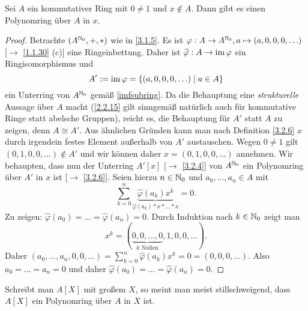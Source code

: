 \documentclass[../../main.tex]{subfiles}
\begin{document}
\begin{sat}\label{polynomialringexists}
Sei $A$ ein kommutativer Ring mit $0\neq 1$ und $x\notin A$. Dann gibt es einen Polynomring über $A$ in $x$.
\end{sat}
\begin{proof}
Betrachte $(A^{\mathbb N_0},+,*)$ wie in \ref{3.1.5}. Es ist $\varphi:A\rightarrow A^{\mathbb N_0}, a\mapsto (a,0,0,0,\ldots)$ [$\to$ \ref{1.1.30} (c)] eine Ringeinbettung. Daher ist $\widehat{\varphi} :A\to \operatorname{im} \varphi$ ein Ringisomorphismus und
\[A':=\operatorname{im}\varphi=\left\{(a,0,0,0,\ldots)\mid a\in A\right\}\] ein Unterring von $A^{\mathbb N_0}$ gemäß \ref{imfsubring}. Da die Behauptung eine \emph{strukturelle} Aussage über $A$ macht (\ref{2.2.15} gilt sinngemäß natürlich auch für kommutative Ringe statt abelsche Gruppen), reicht es, die Behauptung für $A'$ statt $A$ zu zeigen, denn $A\cong A'$. Aus ähnlichen Gründen kann man nach Definition \ref{3.2.6} $x$ durch irgendein festes Element außerhalb von $A'$ austauschen. Wegen $0\neq 1$ gilt $(0,1,0,0,\ldots)\notin A'$ und wir können daher $x=(0,1,0,0,\ldots)$ annehmen. Wir behaupten, dass nun der Unterring $A'[x]$ [$\to$ \ref{3.2.4}] von $A^{\mathbb N_0}$ ein Polynomring über $A'$ in $x$ ist [$\to$ \ref{3.2.6}]. Seien hierzu $n\in\mathbb N_0$ und $a_0,\ldots,a_n\in A$ mit
\[\sum_{k=0}^n \underbrace{\widehat{\varphi} (a_k)x^k}_{\widehat{\varphi} (a_k)*x*\ldots*x}=0.\] Zu zeigen:
$\widehat{\varphi} (a_0)=\ldots=\widehat{\varphi} (a_n)=0$. Durch Induktion nach $k\in\mathbb N_0$ zeigt man
\[x^k=(\underbrace{0,0,\ldots,0}_{k\text{ Nullen}},1,0,0,\ldots).\] Daher $(a_0,\ldots,a_n,0,0,\ldots)=\sum_{k=0}^n\widehat{\varphi}(a_k)x^k=0=(0,0,0,\ldots)$. Also $a_0=\ldots=a_n=0$ und daher $\widehat{\varphi} (a_0)=\ldots=\widehat{\varphi} (a_n)=0$.
\end{proof}

\begin{bem}\label{writeax}
Schreibt man $A[X]$ mit großem $X$, so meint man meist stillschweigend, dass $A[X]$ ein Polynomring über $A$ in $X$ ist.
\end{bem}
\end{document}
